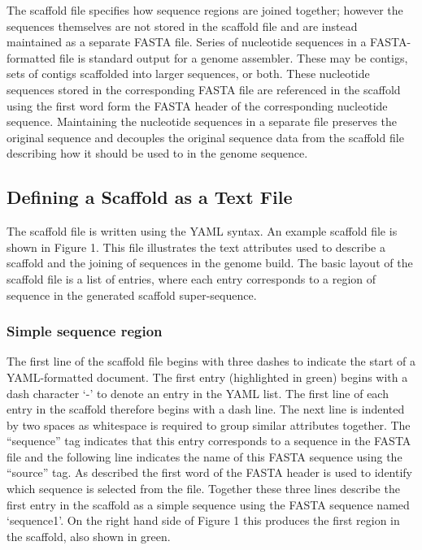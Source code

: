 \documentclass[10pt]{bmc_article}
\newenvironment{bmcformat}{\begin{raggedright}\baselineskip20pt\sloppy\setboolean{publ}{false}}{\end{raggedright}\baselineskip20pt\sloppy}
\begin{document}
\begin{bmcformat}
The scaffold file specifies how sequence regions are joined together; however
the sequences themselves are not stored in the scaffold file and are instead
maintained as a separate FASTA file. Series of nucleotide sequences in
a FASTA-formatted file is standard output for a genome assembler. These may be
contigs, sets of contigs scaffolded into larger sequences, or both. These
nucleotide sequences stored in the corresponding FASTA file are referenced in
the scaffold using the first word form the FASTA header of the corresponding
nucleotide sequence. Maintaining the nucleotide sequences in a separate file
preserves the original sequence and decouples the original sequence data from
the scaffold file describing how it should be used to in the genome sequence.
\pb

\subsection*{Defining a Scaffold as a Text File} %

The scaffold file is written using the YAML syntax. An example scaffold file is
shown in Figure 1. This file illustrates the text attributes used to describe
a scaffold and the joining of sequences in the genome build. The basic layout
of the scaffold file is a list of entries, where each entry corresponds to
a region of sequence in the generated scaffold super-sequence. \pb

\subsubsection*{Simple sequence region} %

The first line of the scaffold file begins with three dashes to indicate the
start of a YAML-formatted document. The first entry (highlighted in green)
begins with a dash character `-' to denote an entry in the YAML list. The first
line of each entry in the scaffold therefore begins with a dash line. The next
line is indented by two spaces as whitespace is required to group similar
attributes together. The ``sequence'' tag indicates that this entry corresponds
to a sequence in the FASTA file and the following line indicates the name of
this FASTA sequence using the ``source'' tag. As described the first word of
the FASTA header is used to identify which sequence is selected from the file.
Together these three lines describe the first entry in the scaffold as a simple
sequence using the FASTA sequence named `sequence1'. On the right hand side of
Figure 1 this produces the first region in the scaffold, also shown in green.
\pb


\end{bmcformat}
\end{document}
